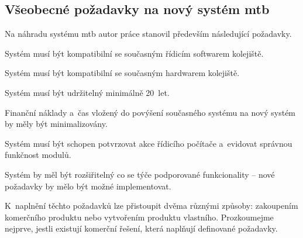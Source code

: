 \subsection{Všeobecné požadavky na nový systém \gls{mtb}} \label{subsec:gen_requirements}

Na náhradu systému \gls{mtb} autor práce stanovil především následující
požadavky.

\begin{compactenum}
\item Systém musí být kompatibilní se současným řídicím softwarem kolejiště.
\item Systém musí být kompatibilní se současným hardwarem kolejiště.
\item Systém musí být udržitelný minimálně 20~let.
\item Finanční náklady a~čas vložený do povýšení současného systému na nový
	systém by měly být minimalizovány.
\item Systém musí být schopen potvrzovat akce řídicího počítače a~evidovat správnou
	funkčnost modulů.
\item Systém by měl být rozšiřitelný co se týče podporované funkcionality –
	nové požadavky by mělo být možné implementovat.
\end{compactenum}

K~naplnění těchto požadavků lze přistoupit dvěma různými způsoby: zakoupením
komerčního produktu nebo vytvořením produktu vlastního. Prozkoumejme nejprve,
jestli existují komerční řešení, která naplňují definované požadavky.
